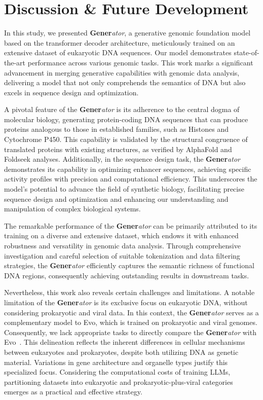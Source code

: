 \section{Discussion \& Future Development}
In this study, we presented \textbf{Gener}\textit{ator}, a generative genomic foundation model based on the transformer decoder architecture, meticulously trained on an extensive dataset of eukaryotic DNA sequences. Our model demonstrates state-of-the-art performance across various genomic tasks. This work marks a significant advancement in merging generative capabilities with genomic data analysis, delivering a model that not only comprehends the semantics of DNA but also excels in sequence design and optimization.

A pivotal feature of the \textbf{Gener}\textit{ator} is its adherence to the central dogma of molecular biology, generating protein-coding DNA sequences that can produce proteins analogous to those in established families, such as Histones and Cytochrome P450. This capability is validated by the structural congruence of translated proteins with existing structures, as verified by AlphaFold and Foldseek analyses. Additionally, in the sequence design task, the \textbf{Gener}\textit{ator} demonstrates its capability in optimizing enhancer sequences, achieving specific activity profiles with precision and computational efficiency. This underscores the model’s potential to advance the field of synthetic biology, facilitating precise sequence design and optimization and enhancing our understanding and manipulation of complex biological systems.

The remarkable performance of the \textbf{Gener}\textit{ator} can be primarily attributed to its training on a diverse and extensive dataset, which endows it with enhanced robustness and versatility in genomic data analysis. Through comprehensive investigation and careful selection of suitable tokenization and data filtering strategies, the \textbf{Gener}\textit{ator} efficiently captures the semantic richness of functional DNA regions, consequently achieving outstanding results in downstream tasks.

Nevertheless, this work also reveals certain challenges and limitations. A notable limitation of the \textbf{Gener}\textit{ator} is its exclusive focus on eukaryotic DNA, without considering prokaryotic and viral data. In this context, the \textbf{Gener}\textit{ator} serves as a complementary model to Evo, which is trained on prokaryotic and viral genomes. Consequently, we lack appropriate tasks to directly compare the \textbf{Gener}\textit{ator} with Evo~\cite{Evo}. This delineation reflects the inherent differences in cellular mechanisms between eukaryotes and prokaryotes, despite both utilizing DNA as genetic material. Variations in gene architecture and organelle types justify this specialized focus. Considering the computational costs of training LLMs, partitioning datasets into eukaryotic and prokaryotic-plus-viral categories emerges as a practical and effective strategy.

